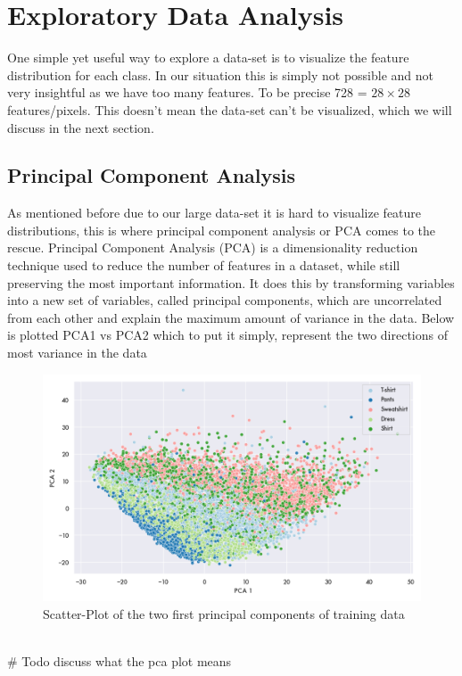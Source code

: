 \section{Exploratory Data Analysis}

One simple yet useful way to explore a data-set is to visualize the feature distribution for each class. In our situation this is simply not possible and not very insightful as we have too many features. To be precise 728 = $28\times28$ features/pixels. This doesn't mean the data-set can't be visualized, which we will discuss in the next section. 


\subsection{Principal Component Analysis}
As mentioned before due to our large data-set it is hard to visualize feature distributions, this is where principal component analysis or PCA comes to the rescue. Principal Component Analysis (PCA) is a dimensionality reduction technique used to reduce the number of features in a dataset, while still preserving the most important information. It does this by transforming variables into a new set of variables, called principal components, which are uncorrelated from each other and explain the maximum amount of variance in the data. Below is plotted PCA1 vs PCA2 which to put it simply, represent the two directions of most variance in the data \\

\begin{figure}[ht]
\centering
\includegraphics[scale=0.5]{reports/figures_for_report/pca_plot.png}
\captionsetup{justification=centering,margin=2cm}
\caption{Scatter-Plot of the two first principal components of training data}
\label{feature_distribution_classes}
\end{figure} \\

# Todo discuss what the pca plot means 
